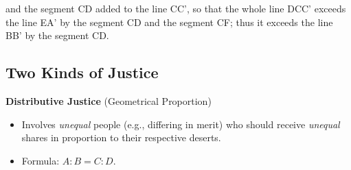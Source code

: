 \begin{example}
                        \vspace{1em}
    
                        and the segment CD added to the line CC', so that the whole line DCC' exceeds the line EA' by the segment CD and the segment CF; thus it exceeds the line BB' by the segment CD.
    
                        \begin{center}
                        \end{center}
                        
                    \end{example}

\newpage

            \subsection{Two Kinds of Justice}

                \begin{definition}
                    \textbf{Distributive Justice} (Geometrical Proportion)
                    \begin{itemize}
                      \item Involves \textit{unequal} people (e.g., differing in merit) who should receive \textit{unequal} shares in proportion to their respective deserts.
                      \item Formula: $A : B = C : D$.
                    \end{itemize}
                \end{definition}

